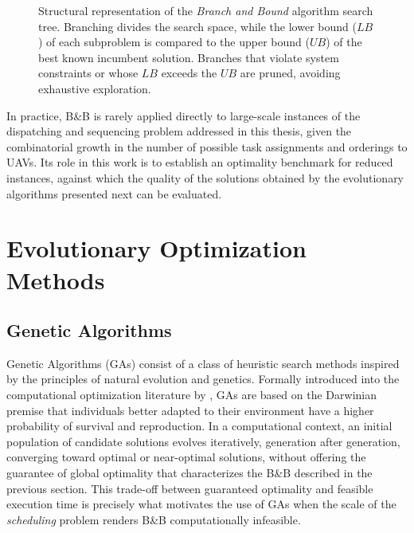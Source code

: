 \begin{figure}[htbp]
{
    }
    \caption{Structural representation of the \textit{Branch and Bound} algorithm search tree. Branching divides the search space, while the lower bound ($LB$) of each subproblem is compared to the upper bound ($UB$) of the best known incumbent solution. Branches that violate system constraints or whose $LB$ exceeds the $UB$ are pruned, avoiding exhaustive exploration.}
    \label{fig:branch_and_bound_tree}
\end{figure}

In practice, B\&B is rarely applied directly to large-scale instances of the dispatching and sequencing problem addressed in this thesis, given the combinatorial growth in the number of possible task assignments and orderings to UAVs. Its role in this work is to establish an optimality benchmark for reduced instances, against which the quality of the solutions obtained by the evolutionary algorithms presented next can be evaluated.

\section{Evolutionary Optimization Methods}\label{sec:evolutivos}

\subsection{Genetic Algorithms}

Genetic Algorithms (GAs) consist of a class of heuristic search methods inspired by the principles of natural evolution and genetics. Formally introduced into the computational optimization literature by \citeauthor{Holland1975} \cite{Holland1975}, GAs are based on the Darwinian premise that individuals better adapted to their environment have a higher probability of survival and reproduction. In a computational context, an initial population of candidate solutions evolves iteratively, generation after generation, converging toward optimal or near-optimal solutions, without offering the guarantee of global optimality that characterizes the B\&B described in the previous section. This trade-off between guaranteed optimality and feasible execution time is precisely what motivates the use of GAs when the scale of the \textit{scheduling} problem renders B\&B computationally infeasible.

